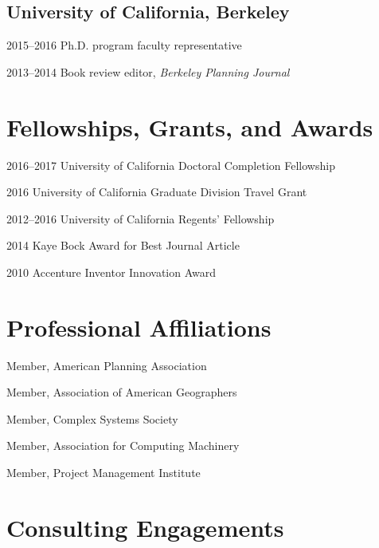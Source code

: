 \documentclass[12pt,letterpaper]{report}
\newcommand{\listitemspace}{0.2em}
\renewenvironment{itemize}{
  \begin{list}{}{
      \setlength{\leftmargin}{0em}
      \setlength{\parskip}{0em}
      \setlength{\itemsep}{\listitemspace}
      \setlength{\parsep}{\listitemspace}
    }
}{
  \end{list}
}
\begin{document}
\subsection*{University of California, Berkeley}

\begin{tablist}
\item[2015--2016] \tab Ph.D. program faculty representative
\item[2013--2014] \tab Book review editor, \emph{Berkeley Planning Journal}
\end{tablist}


\section*{Fellowships, Grants, and Awards}

\begin{tablist}
\item[2016--2017] \tab University of California Doctoral Completion Fellowship
\item[2016] \tab University of California Graduate Division Travel Grant
\item[2012--2016] \tab University of California Regents' Fellowship
\item[2014] \tab Kaye Bock Award for Best Journal Article
\item[2010] \tab Accenture Inventor Innovation Award
\end{tablist}



\section*{Professional Affiliations}

\begin{itemize}
\item Member, American Planning Association
\item Member, Association of American Geographers
\item Member, Complex Systems Society
\item Member, Association for Computing Machinery
\item Member, Project Management Institute
\end{itemize}



\section*{Consulting Engagements}
\end{document}
